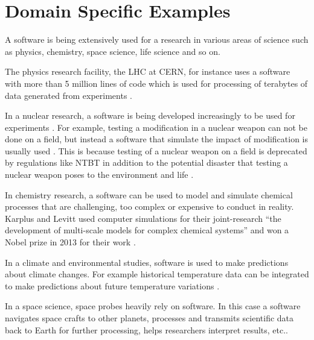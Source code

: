 \section{Domain Specific Examples}
\label{subsec:background:first_section:second_subsection}
A software is being extensively used for a research in various areas of science such as physics, chemistry, space science, life science and so on.

The physics research facility, the \ac{LHC} at \ac{CERN}, for instance uses a software with more than 5 million lines of code which is used for processing of terabytes of data generated from experiments \citep{storer2017bridging}.


In a nuclear research, a software is being developed increasingly to be used for experiments \citep{yan2017case}. For example, testing a modification in a nuclear weapon can not be done on a field, but instead a software that simulate the impact of modification is usually used \citep{kanewala2014testing}. This is because testing of a nuclear weapon on a field is deprecated by regulations like \ac{NTBT} in addition to the potential disaster that testing a nuclear weapon poses to the environment and life \citep{enwiki:1053274189}. 

In chemistry research, a software can be used to model and simulate chemical processes that are challenging, too complex or expensive to conduct in reality. Karplus and Levitt used computer simulations for their joint-research “the development of multi-scale models for complex chemical systems”  and won a Nobel prize in 2013 for their work \citep{storer2017bridging, andre2014nobel}.  

In a climate and environmental studies, software is used to make predictions about climate changes. For example historical temperature data can be integrated to make predictions about future temperature variations \citep{storer2017bridging}.

In a space science, space probes heavily rely on software. In this case a software navigates space crafts to other planets, processes and transmits scientific data back to Earth for further processing, helps researchers interpret results, etc.\citep{lutz2011software}. 

